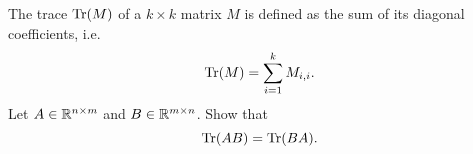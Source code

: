 \documentclass[11pt,nocut]{article}
\begin{document}
\begin{problem}
	The trace ${{\rm Tr}}(M)$ of a $k \times k$ matrix $M$ is defined as the sum of its diagonal coefficients, i.e.
	$$
	{{\rm Tr}}(M) = \sum_{i=1}^k M_{i,i}.
	$$
	Let $A \in \mathbb{R}^{n \times m}$ and $B \in \mathbb{R}^{m \times n}$. Show that
	$$
	{{\rm Tr}}(AB) = {{\rm Tr}}(BA).
	$$
\end{problem}



\vspace{1cm}
\centerline{}

%
%
\end{document}

